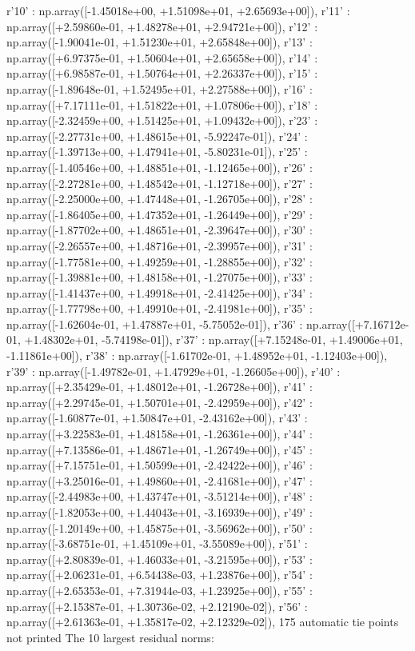 r'10' : np.array([-1.45018e+00, +1.51098e+01, +2.65693e+00]),
r'11' : np.array([+2.59860e-01, +1.48278e+01, +2.94721e+00]),
r'12' : np.array([-1.90041e-01, +1.51230e+01, +2.65848e+00]),
r'13' : np.array([+6.97375e-01, +1.50604e+01, +2.65658e+00]),
r'14' : np.array([+6.98587e-01, +1.50764e+01, +2.26337e+00]),
r'15' : np.array([-1.89648e-01, +1.52495e+01, +2.27588e+00]),
r'16' : np.array([+7.17111e-01, +1.51822e+01, +1.07806e+00]),
r'18' : np.array([-2.32459e+00, +1.51425e+01, +1.09432e+00]),
r'23' : np.array([-2.27731e+00, +1.48615e+01, -5.92247e-01]),
r'24' : np.array([-1.39713e+00, +1.47941e+01, -5.80231e-01]),
r'25' : np.array([-1.40546e+00, +1.48851e+01, -1.12465e+00]),
r'26' : np.array([-2.27281e+00, +1.48542e+01, -1.12718e+00]),
r'27' : np.array([-2.25000e+00, +1.47448e+01, -1.26705e+00]),
r'28' : np.array([-1.86405e+00, +1.47352e+01, -1.26449e+00]),
r'29' : np.array([-1.87702e+00, +1.48651e+01, -2.39647e+00]),
r'30' : np.array([-2.26557e+00, +1.48716e+01, -2.39957e+00]),
r'31' : np.array([-1.77581e+00, +1.49259e+01, -1.28855e+00]),
r'32' : np.array([-1.39881e+00, +1.48158e+01, -1.27075e+00]),
r'33' : np.array([-1.41437e+00, +1.49918e+01, -2.41425e+00]),
r'34' : np.array([-1.77798e+00, +1.49910e+01, -2.41981e+00]),
r'35' : np.array([-1.62604e-01, +1.47887e+01, -5.75052e-01]),
r'36' : np.array([+7.16712e-01, +1.48302e+01, -5.74198e-01]),
r'37' : np.array([+7.15248e-01, +1.49006e+01, -1.11861e+00]),
r'38' : np.array([-1.61702e-01, +1.48952e+01, -1.12403e+00]),
r'39' : np.array([-1.49782e-01, +1.47929e+01, -1.26605e+00]),
r'40' : np.array([+2.35429e-01, +1.48012e+01, -1.26728e+00]),
r'41' : np.array([+2.29745e-01, +1.50701e+01, -2.42959e+00]),
r'42' : np.array([-1.60877e-01, +1.50847e+01, -2.43162e+00]),
r'43' : np.array([+3.22583e-01, +1.48158e+01, -1.26361e+00]),
r'44' : np.array([+7.13586e-01, +1.48671e+01, -1.26749e+00]),
r'45' : np.array([+7.15751e-01, +1.50599e+01, -2.42422e+00]),
r'46' : np.array([+3.25016e-01, +1.49860e+01, -2.41681e+00]),
r'47' : np.array([-2.44983e+00, +1.43747e+01, -3.51214e+00]),
r'48' : np.array([-1.82053e+00, +1.44043e+01, -3.16939e+00]),
r'49' : np.array([-1.20149e+00, +1.45875e+01, -3.56962e+00]),
r'50' : np.array([-3.68751e-01, +1.45109e+01, -3.55089e+00]),
r'51' : np.array([+2.80839e-01, +1.46033e+01, -3.21595e+00]),
r'53' : np.array([+2.06231e-01, +6.54438e-03, +1.23876e+00]),
r'54' : np.array([+2.65353e-01, +7.31944e-03, +1.23925e+00]),
r'55' : np.array([+2.15387e-01, +1.30736e-02, +2.12190e-02]),
r'56' : np.array([+2.61363e-01, +1.35817e-02, +2.12329e-02]),
175 automatic tie points not printed
The 10 largest residual norms:
